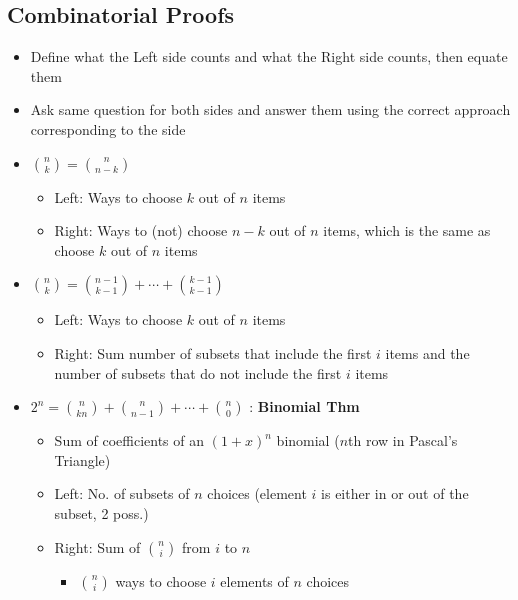 \documentclass{article}\usepackage{amsmath,amssymb,amsthm,tikz,tkz-graph,color,chngpage,soul,hyperref,csquotes,graphicx,floatrow, listings}\newcommand*{\QEDB}{\hfill\ensuremath{\square}}\newtheorem*{prop}{Proposition}\renewcommand{\theenumi}{\alph{enumi}}\usepackage[shortlabels]{enumitem}\usepackage[nobreak=true]{mdframed}\usetikzlibrary{matrix,calc}\MakeOuterQuote{"}\usepackage[margin=0.75in]{geometry} \newtheorem{theorem}{Theorem}\newcommand{\Z}{\mathbb Z}\newcommand{\R}{\mathbb R}\newcommand{\Q}{\mathbb Q}\newcommand{\N}{\mathbb N}\newcommand{\x}[1]{\textrm{#1}}
\begin{document}
\subsection*{Combinatorial Proofs}
\begin{mdframed}
\begin{itemize}
    \item Define what the Left side counts and what the Right side counts, then equate them
    \item Ask same question for both sides and answer them using the correct approach corresponding to the side
\end{itemize}
\end{mdframed}
\begin{itemize}
    \item $\binom{n}{k} = \binom{n}{n-k}$
    \begin{itemize}
        \item Left: Ways to choose $k$ out of $n$ items
        \item Right: Ways to (not) choose $n-k$ out of $n$ items, which is the same as choose $k$ out of $n$ items
    \end{itemize}
    \item $\binom{n}{k}=\binom{n-1}{k-1}+\cdots+\binom{k-1}{k-1}$
    \begin{itemize}
        \item Left: Ways to choose $k$ out of $n$ items
        \item Right: Sum number of subsets that include the first $i$ items and the number of subsets that do not include the first $i$ items
    \end{itemize}
    \item $2^n=\binom{n}{kn}+\binom{n}{n-1}+\cdots+\binom{n}{0}$ : \textbf{Binomial Thm}
    \begin{itemize}
        \item Sum of coefficients of an $(1+x)^n$ binomial ($n$th row in Pascal's Triangle)
        \item Left: No. of subsets of $n$ choices (element $i$ is either in or out of the subset, 2 poss.)
        \item Right: Sum of $\binom{n}{i}$ from $i$ to $n$
        \begin{itemize}
            \item $\binom{n}{i}$ ways to choose $i$ elements of $n$ choices
        \end{itemize}
    \end{itemize}
\end{itemize}
\end{document}
